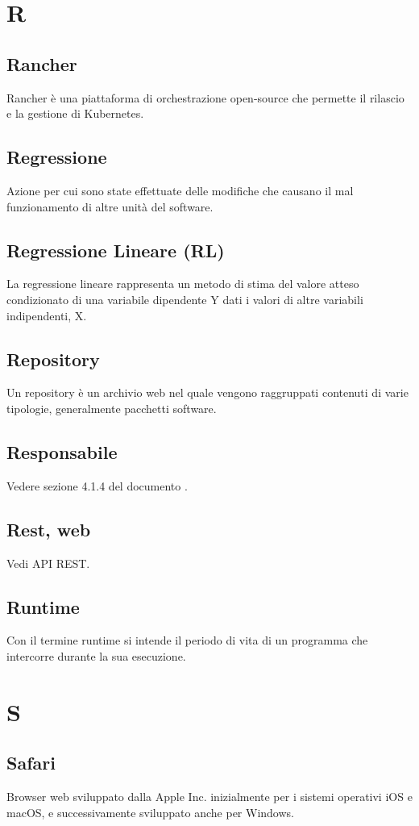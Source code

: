 \newpage \section{R}
\subsection{Rancher}  Rancher è una piattaforma di orchestrazione open-source che permette il rilascio e la gestione di Kubernetes.
\subsection{Regressione}  Azione per cui sono state effettuate delle modifiche che causano il mal funzionamento di altre unità del software.
\subsection{Regressione Lineare (RL)}  La regressione lineare rappresenta un metodo di stima del valore atteso condizionato di una variabile dipendente Y dati i valori di altre variabili indipendenti, X.
\subsection{Repository}  Un repository è un archivio web nel quale vengono raggruppati contenuti di varie tipologie, generalmente pacchetti software.
\subsection{Responsabile}  Vedere sezione 4.1.4 del documento .
\subsection{Rest, web }  Vedi API REST.
\subsection{Runtime}  Con il termine runtime si intende il periodo di vita di un programma che intercorre durante la sua esecuzione.

\newpage \section{S}
\subsection{Safari}  Browser web sviluppato dalla Apple Inc. inizialmente per i sistemi operativi iOS e macOS, e successivamente sviluppato anche per Windows.
